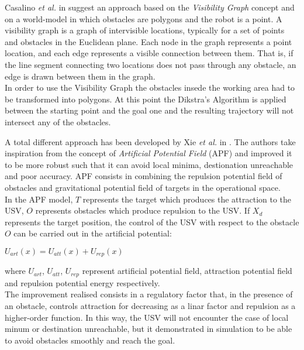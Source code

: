\documentclass[journal]{IEEEtran}
\begin{document}
              \indent Casalino \textit{et al.} in \cite{Casalino2009} suggest an approach based on the \textit{Visibility Graph} concept and on a world-model in which obstacles are polygons and the robot is a point. A visibility graph is a graph of intervisible locations, typically for a set of points and obstacles in the Euclidean plane. Each node in the graph represents a point location, and each edge represents a visible connection between them. That is, if the line segment connecting two locations does not pass through any obstacle, an edge is drawn between them in the graph.\\
              In order to use the Visibility Graph the obstacles insede the working area had to be transformed into polygons. At this point the Dikstra's Algorithm is applied between the starting point and the goal one and the resulting trajectory will not intersect any of the obstacles.

              A total different approach has been developed by Xie \textit{et al.} in \cite{Xie2014}. The authors take inspiration from the concept of \textit{Artificial Potential Field} (APF) \cite{Khatib1985} and improved it to be more robust such that it can avoid local minima, destionation unreachable and poor accuracy. APF consists in combining the repulsion potential field of obstacles and gravitational potential field of targets in the operational space.\\
              In the APF model, $T$ represents the target which produces the attraction to the USV, $O$ represents obstacles which produce repulsion to the USV. If $X_d$ represents the target position, the control of the USV with respect to the obstacle $O$ can be carried out in the artificial potential:
                  \begin{center}
                         $U_{art}(x) = U_{att}(x) + U_{rep}(x)$
                  \end{center}
              where $U_{art}$, $U_{att}$, $U_{rep}$ represent artificial potential field, attraction potential field and repulsion potential energy respectively.\\
              The improvement realised consists in a regulatory factor that, in the presence of an obstacle, controls attraction for decreasing as a linar factor and repulsion as a higher-order function. In this way, the USV will not encounter the case of local minum or destination unreachable, but it demonstrated in simulation to be able to avoid obstacles smoothly and reach the goal.\\
\end{document}
